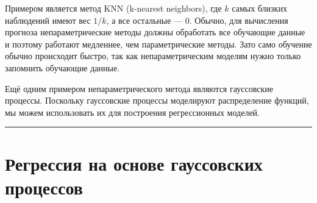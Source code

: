 \documentclass[11pt,a4paper]{article}
\begin{document}
    \begin{center}
    \end{center}
    
    \begin{center}
    \end{center}
    
    \begin{center}
    \end{center}
    
    \begin{center}
    \end{center}

Примером является метод KNN (k-nearest neighbors), где \(k\) самых
близких наблюдений имеют вес \(1/k\), а все остальные --- \(0\). Обычно,
для вычисления прогноза непараметрические методы должны обработать все
обучающие данные и поэтому работают медленнее, чем параметрические
методы. Зато само обучение обычно происходит быстро, так как
непараметрическим моделям нужно только запомнить обучающие данные.

Ещё одним примером непараметрического метода являются гауссовские
процессы. Поскольку гауссовские процессы моделируют распределение
функций, мы можем использовать их для построения регрессионных моделей.

    \begin{center}\rule{0.5\linewidth}{0.5pt}\end{center}

    \hypertarget{ux440ux435ux433ux440ux435ux441ux441ux438ux44f-ux43dux430-ux43eux441ux43dux43eux432ux435-ux433ux430ux443ux441ux441ux43eux432ux441ux43aux438ux445-ux43fux440ux43eux446ux435ux441ux441ux43eux432}{%
\section{Регрессия на основе гауссовских
процессов}\label{ux440ux435ux433ux440ux435ux441ux441ux438ux44f-ux43dux430-ux43eux441ux43dux43eux432ux435-ux433ux430ux443ux441ux441ux43eux432ux441ux43aux438ux445-ux43fux440ux43eux446ux435ux441ux441ux43eux432}}
\end{document}
